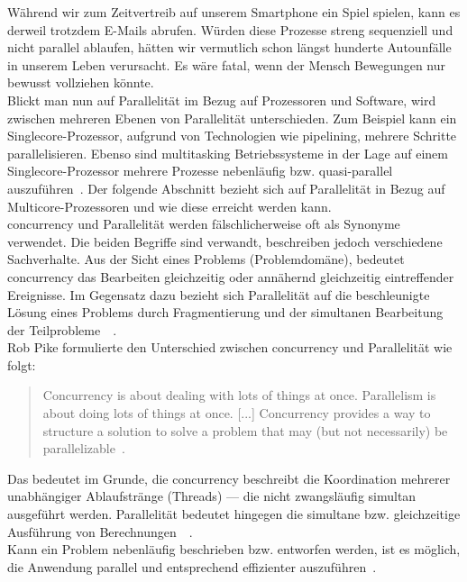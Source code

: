 Während wir zum Zeitvertreib auf unserem Smartphone ein Spiel spielen, kann es derweil trotzdem E-Mails abrufen. Würden diese Prozesse streng sequenziell und nicht parallel ablaufen, hätten wir vermutlich schon längst hunderte Autounfälle in unserem Leben verursacht. Es wäre fatal, wenn der Mensch Bewegungen nur bewusst vollziehen könnte.\\
Blickt man nun auf Parallelität im Bezug auf Prozessoren und Software, wird zwischen mehreren Ebenen von Parallelität unterschieden. Zum Beispiel kann ein Singlecore-Prozessor, aufgrund von Technologien wie \gls{pipelining}, mehrere Schritte parallelisieren. Ebenso sind \gls{multitasking} Betriebssysteme in der Lage auf einem Singlecore-Prozessor mehrere Prozesse nebenläufig bzw. quasi-parallel auszuführen~\cite[S.~3~\&~S.~4]{butcher_seven_2014}. Der folgende Abschnitt bezieht sich auf Parallelität in Bezug auf Multicore-Prozessoren und wie diese erreicht werden kann.\\
\gls{concurrency} und Parallelität werden fälschlicherweise oft als Synonyme verwendet. Die beiden Begriffe sind verwandt, beschreiben jedoch verschiedene Sachverhalte. Aus der Sicht eines Problems (Problemdomäne), bedeutet \gls{concurrency} das Bearbeiten gleichzeitig oder annähernd gleichzeitig eintreffender Ereignisse. Im Gegensatz dazu bezieht sich Parallelität auf die beschleunigte Lösung eines Problems durch Fragmentierung und der simultanen Bearbeitung der Teilprobleme~\cite[S.~1~\&~S.~2]{butcher_seven_2014}~\cite[S.~15]{vernon_reactive_2016}.\\
Rob Pike formulierte den Unterschied zwischen \gls{concurrency} und Parallelität wie folgt:

\begin{quotation}
  Concurrency is about dealing with lots of things at once. Parallelism is about doing lots of things at once. [...] Concurrency provides a way to structure a solution to solve a problem that may (but not necessarily) be parallelizable~.
\cite[S.~10]{pike_concurrency_2012}
\end{quotation}

Das bedeutet im Grunde, die \gls{concurrency} beschreibt die Koordination mehrerer unabhängiger Ablaufstränge (Threads) --- die nicht zwangsläufig simultan ausgeführt werden. Parallelität bedeutet hingegen die simultane bzw. gleichzeitige Ausführung von Berechnungen~\cite[S.~8-9]{pike_concurrency_2012}~\cite[S.~3]{butcher_seven_2014}.\\

Kann ein Problem nebenläufig beschrieben bzw. entworfen werden, ist es möglich, die Anwendung parallel und entsprechend effizienter auszuführen~\cite[S.~19~\&~S.~30]{pike_concurrency_2012}.\\


